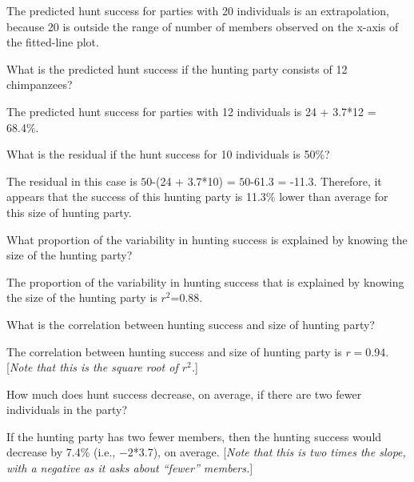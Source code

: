 \documentclass[10pt,openany]{book}\usepackage[]{graphicx}\usepackage[]{color}
\begin{document}
\begin{QAlist}
  \begin{QAlist}
    \item The predicted hunt success for parties with 20 individuals is an extrapolation, because 20 is outside the range of number of members observed on the x-axis of the fitted-line plot.
  \end{QAlist}
  \item What is the predicted hunt success if the hunting party consists of 12 chimpanzees?
  \begin{QAlist}
    \item The predicted hunt success for parties with 12 individuals is 24 + 3.7*12 = 68.4\%.
  \end{QAlist}
  \item What is the residual if the hunt success for 10 individuals is 50\%?
  \begin{QAlist}
    \item The residual in this case is $50$-(24 + 3.7*10) = $50$-61.3 = -11.3. Therefore, it appears that the success of this hunting party is 11.3\% lower than average for this size of hunting party.
  \end{QAlist}
  \item What proportion of the variability in hunting success is explained by knowing the size of the hunting party?
  \begin{QAlist}
    \item The proportion of the variability in hunting success that is explained by knowing the size of the hunting party is $r^{2}$=0.88.
  \end{QAlist}
  \item What is the correlation between hunting success and size of hunting party?
  \begin{QAlist}
    \item The correlation between hunting success and size of hunting party is $r=$0.94. [\emph{Note that this is the square root of $r^{2}$.}]
  \end{QAlist}
  \item How much does hunt success decrease, on average, if there are two fewer individuals in the party?
  \begin{QAlist}
    \item If the hunting party has two fewer members, then the hunting success would decrease by 7.4\% (i.e., $-2$*3.7), on average. [\emph{Note that this is two times the slope, with a negative as it asks about ``fewer'' members.}]
  \end{QAlist}
\end{QAlist}
\end{document}
